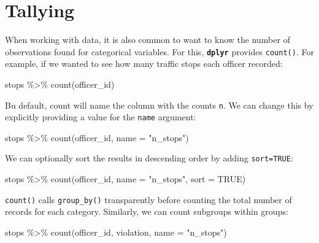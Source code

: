 \documentclass[
]{book}
\newenvironment{Shaded}{\begin{snugshade}}{\end{snugshade}}
\newcommand{\AttributeTok}[1]{\textcolor[rgb]{0.77,0.63,0.00}{#1}}
\newcommand{\ConstantTok}[1]{\textcolor[rgb]{0.00,0.00,0.00}{#1}}
\newcommand{\FunctionTok}[1]{\textcolor[rgb]{0.00,0.00,0.00}{#1}}
\newcommand{\NormalTok}[1]{#1}
\newcommand{\SpecialCharTok}[1]{\textcolor[rgb]{0.00,0.00,0.00}{#1}}
\newcommand{\StringTok}[1]{\textcolor[rgb]{0.31,0.60,0.02}{#1}}
\begin{document}
\hypertarget{tallying}{%
\section{Tallying}\label{tallying}}

When working with data, it is also common to want to know the number of
observations found for categorical variables. For this, \textbf{\texttt{dplyr}}
provides \texttt{count()}. For example, if we wanted to see how many traffic stops each officer recorded:

\begin{Shaded}
\begin{Highlighting}[]
\NormalTok{stops }\SpecialCharTok{\%\textgreater{}\%}
  \FunctionTok{count}\NormalTok{(officer\_id)}
\end{Highlighting}
\end{Shaded}

Bu default, count will name the column with the counts \texttt{n}. We can change this by explicitly providing a value for the \texttt{name} argument:

\begin{Shaded}
\begin{Highlighting}[]
\NormalTok{stops }\SpecialCharTok{\%\textgreater{}\%}
  \FunctionTok{count}\NormalTok{(officer\_id, }\AttributeTok{name =} \StringTok{"n\_stops"}\NormalTok{)}
\end{Highlighting}
\end{Shaded}

We can optionally sort the results in descending order by adding \texttt{sort=TRUE}:

\begin{Shaded}
\begin{Highlighting}[]
\NormalTok{stops }\SpecialCharTok{\%\textgreater{}\%}
  \FunctionTok{count}\NormalTok{(officer\_id, }\AttributeTok{name =} \StringTok{"n\_stops"}\NormalTok{, }\AttributeTok{sort =} \ConstantTok{TRUE}\NormalTok{)}
\end{Highlighting}
\end{Shaded}

\texttt{count()} calls \texttt{group\_by()} transparently before counting the total number of records for each category. Similarly, we can count subgroups within groups:

\begin{Shaded}
\begin{Highlighting}[]
\NormalTok{stops }\SpecialCharTok{\%\textgreater{}\%}
  \FunctionTok{count}\NormalTok{(officer\_id, violation, }\AttributeTok{name =} \StringTok{"n\_stops"}\NormalTok{)}
\end{Highlighting}
\end{Shaded}
\end{document}
